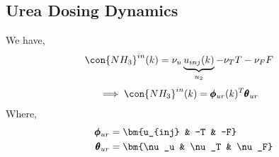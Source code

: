\subsection{Urea Dosing Dynamics}
We have,
\begin{align*}
        \con{NH_3}^{in}(k) &= \nu_u \underbrace{u_{inj}(k)}_{u_2} - \nu_T T - \nu_F F
\end{align*}
\begin{align}
        \implies \con{NH_3}^{in}(k)  &= \pmb \phi_{ur}(k) ^T \pmb \theta_{ur}  \label{eqn::urea_parm}
\end{align}
Where,
\begin{align*}
        \pmb \phi_{ur} &= \bm{u_{inj} & -T & -F}\\
        \pmb \theta_{ur} &= \bm{\nu_u & \nu_T & \nu_F}
\end{align*}
